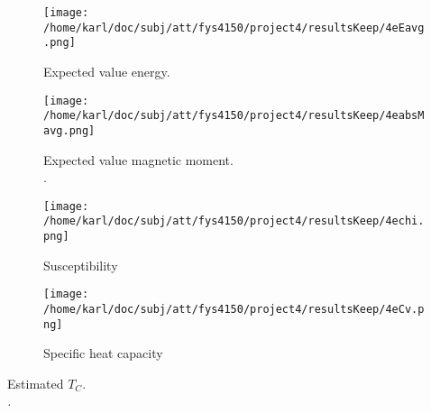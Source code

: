 \documentclass{article}
\begin{document}
\begin{minipage}{.45\textwidth} 
	\begin{figure}[H]
		\centering
		\texttt{[image: /home/karl/doc/subj/att/fys4150/project4/resultsKeep/4eEavg.png]}
		\caption{Expected value energy. \\ \textit{}}
		\label{1}
	\end{figure}
\end{minipage}\hfill
\begin{minipage}{.45\textwidth} 
	\begin{figure}[H]
		\centering
		\texttt{[image: /home/karl/doc/subj/att/fys4150/project4/resultsKeep/4eabsMavg.png]}
		\caption{Expected value magnetic moment.\\ \textit{}.}
		\label{1}
	\end{figure}
\end{minipage}\hfill
\vspace{2ex}

\begin{minipage}{.45\textwidth} 
	\begin{figure}[H]
		\centering
		\texttt{[image: /home/karl/doc/subj/att/fys4150/project4/resultsKeep/4echi.png]}
		\caption{Susceptibility\\ \textit{}}
		\label{1}
	\end{figure}
\end{minipage}\hfill
\begin{minipage}{.45\textwidth} 
	\begin{figure}[H]
		\centering
		\texttt{[image: /home/karl/doc/subj/att/fys4150/project4/resultsKeep/4eCv.png]}
		\caption{Specific heat capacity\\ \textit{}}
		\label{1}
	\end{figure}
\end{minipage}\hfill
\vspace{2ex}


\begin{table}[H]
	\centering
	\begin{adjustbox}{width=.5\textwidth}
	\end{adjustbox}
	\caption{Estimated $T_C$. \\ \textit{.}}
	\label{1}
\end{table}
\end{document}
